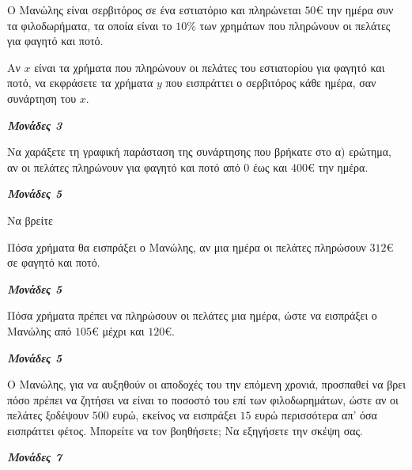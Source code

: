 \documentclass[11pt,a4paper,twoside]{book}
\newcommand{\monades}[1]{
\hspace*{\fill}
\textbf{\textit{\textcolor{maincolor}{Μονάδες #1}}}}
\begin{document}
Ο Μανώλης είναι σερβιτόρος σε ένα εστιατόριο και πληρώνεται $50\euro$ την ημέρα συν τα φιλοδωρήματα, τα οποία είναι το $10\%$ των χρημάτων που πληρώνουν οι πελάτες για φαγητό και ποτό.

\begin{alist}
\item Αν $x$ είναι τα χρήματα που πληρώνουν οι πελάτες του εστιατορίου για φαγητό και ποτό, να εκφράσετε τα χρήματα $y$ που εισπράττει ο σερβιτόρος κάθε ημέρα, σαν συνάρτηση του $x$.
\monades{3}
\item Να χαράξετε τη γραφική παράσταση της συνάρτησης που βρήκατε στο α) ερώτημα, αν οι πελάτες πληρώνουν για φαγητό και ποτό από $0$ έως και $400\euro$ την ημέρα.
\monades{5}
\begin{center}

\end{center}

\item Να βρείτε

\begin{rlist}
\item Πόσα χρήματα θα εισπράξει ο Μανώλης, αν μια ημέρα οι πελάτες πληρώσουν $312\euro$ σε φαγητό και ποτό.
\monades{5}
\item Πόσα χρήματα πρέπει να πληρώσουν οι πελάτες μια ημέρα, ώστε να εισπράξει ο Μανώλης από $105\euro$ μέχρι και $120\euro$.
\monades{5}
\end{rlist}
\item Ο Μανώλης, για να αυξηθούν οι αποδοχές του την επόμενη χρονιά, προσπαθεί να βρει πόσο πρέπει να ζητήσει να είναι το ποσοστό του επί των φιλοδωρημάτων, ώστε αν οι πελάτες ξοδέψουν $500$ ευρώ, εκείνος να εισπράξει $15$ ευρώ περισσότερα απ' όσα εισπράττει φέτος. Μπορείτε να τον βοηθήσετε; Να εξηγήσετε την σκέψη σας.
\monades{7}
\end{alist}
\end{document}
